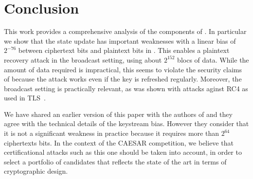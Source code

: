
\section{Conclusion}
\label{sec/Conclusion}

This work provides a comprehensive analysis of the components of
\morus.  In particular we show that the state update has important
weaknesses with a linear bias of $2^{-76}$ between ciphertext bits and
plaintext bits in \morus[1280].  This enables a plaintext recovery
attack in the broadcast setting, using about $2^{152}$ blocs of data.
While the amount of data required is impractical, this seems to
violate the security claims of \morus[1280] because the attack works
even if the key is refreshed regularly.  Moreover, the broadcast
setting is practically relevant, as was shown with attacks aginst RC4
as used in TLS~\cite{DBLP:conf/uss/AlFardanBPPS13}.

We have shared an earlier version of this paper with the authors of
\morus and they agree with the technical details of the keystream
bias.  However they consider that it is not a significant weakness in
practice because it requires more than $2^{64}$ ciphertexts bits.  In
the context of the CAESAR competition, we believe that certificational
attacks such as this one should be taken into account, in order to
select a portfolio of candidates that reflects the state of the art in
terms of cryptographic design.


